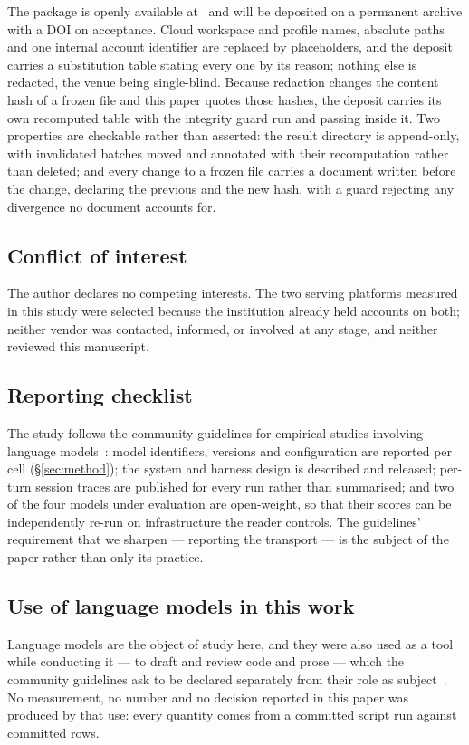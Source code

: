 The package is openly available at \artifacturl{}\ and will be deposited on a permanent archive with a DOI
on acceptance. Cloud workspace and profile names, absolute paths and one internal account identifier are
replaced by placeholders, and the deposit carries a substitution table stating every one by its reason;
nothing else is redacted, the venue being single-blind. Because redaction changes the content hash of a
frozen file and this paper quotes those hashes, the deposit carries its own recomputed table with the
integrity guard run and passing inside it. Two properties are checkable rather than asserted: the result
directory is append-only, with invalidated batches moved and annotated with their recomputation rather
than deleted; and every change to a frozen file carries a document written before the change, declaring
the previous and the new hash, with a guard rejecting any divergence no document accounts for.

\subsection*{Conflict of interest}

The author declares no competing interests. The two serving platforms measured in this study
were selected because the institution already held accounts on both; neither vendor was
contacted, informed, or involved at any stage, and neither reviewed this manuscript.

\subsection*{Reporting checklist}

The study follows the community guidelines for empirical studies involving language
models~\citep{baltes2026guidelines}: model identifiers, versions and configuration are reported
per cell (\S\ref{sec:method}); the system and harness design is described and released; per-turn
session traces are published for every run rather than summarised; and two of the four models
under evaluation are open-weight, so that their scores can be independently re-run on
infrastructure the reader controls. The guidelines' requirement that we sharpen --- reporting
the transport --- is the subject of the paper rather than only its practice.

\subsection*{Use of language models in this work}

Language models are the object of study here, and they were also used as a tool while conducting it --- to
draft and review code and prose --- which the community guidelines ask to be declared separately from their
role as subject~\citep{baltes2026guidelines}. No measurement, no number and no decision reported in this
paper was produced by that use: every quantity comes from a committed script run against committed rows.
